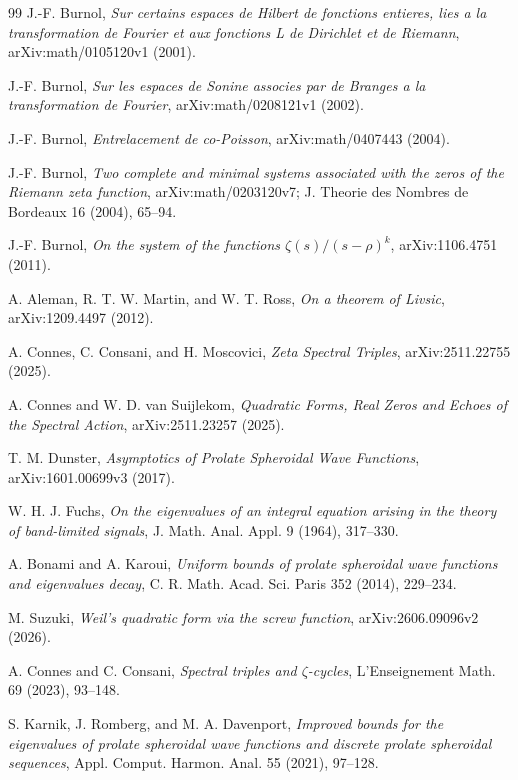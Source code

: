 \documentclass[11pt]{article}
\theoremstyle{remark}
\begin{document}
\begin{thebibliography}{99}
\small
\setlength{\itemsep}{2pt}
J.-F. Burnol,
\emph{Sur certains espaces de Hilbert de fonctions entieres, lies a la transformation de Fourier et aux fonctions L de Dirichlet et de Riemann},
arXiv:math/0105120v1 (2001).

J.-F. Burnol,
\emph{Sur les espaces de Sonine associes par de Branges a la transformation de Fourier},
arXiv:math/0208121v1 (2002).

J.-F. Burnol,
\emph{Entrelacement de co-Poisson},
arXiv:math/0407443 (2004).

J.-F. Burnol,
\emph{Two complete and minimal systems associated with the zeros of the Riemann zeta function},
arXiv:math/0203120v7; J. Theorie des Nombres de Bordeaux 16 (2004), 65--94.

J.-F. Burnol,
\emph{On the system of the functions $\zeta(s)/(s-\rho)^k$},
arXiv:1106.4751 (2011).

A. Aleman, R. T. W. Martin, and W. T. Ross,
\emph{On a theorem of Livsic},
arXiv:1209.4497 (2012).

A. Connes, C. Consani, and H. Moscovici,
\emph{Zeta Spectral Triples},
arXiv:2511.22755 (2025).

A. Connes and W. D. van Suijlekom,
\emph{Quadratic Forms, Real Zeros and Echoes of the Spectral Action},
arXiv:2511.23257 (2025).

T. M. Dunster,
\emph{Asymptotics of Prolate Spheroidal Wave Functions},
arXiv:1601.00699v3 (2017).

W. H. J. Fuchs,
\emph{On the eigenvalues of an integral equation arising in the theory of band-limited signals},
J. Math. Anal. Appl. 9 (1964), 317--330.

A. Bonami and A. Karoui,
\emph{Uniform bounds of prolate spheroidal wave functions and eigenvalues decay},
C. R. Math. Acad. Sci. Paris 352 (2014), 229--234.

M. Suzuki,
\emph{Weil's quadratic form via the screw function},
arXiv:2606.09096v2 (2026).

A. Connes and C. Consani,
\emph{Spectral triples and $\zeta$-cycles},
L'Enseignement Math. 69 (2023), 93--148.

S. Karnik, J. Romberg, and M. A. Davenport,
\emph{Improved bounds for the eigenvalues of prolate spheroidal wave functions and discrete prolate spheroidal sequences},
Appl. Comput. Harmon. Anal. 55 (2021), 97--128.


\end{thebibliography}
\end{document}
